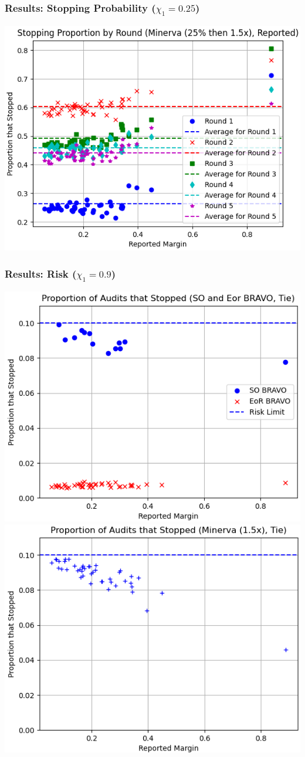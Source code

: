 \documentclass[aspectratio=169]{beamer}
\begin{document}
\begin{frame}
\frametitle{Results: Stopping Probability ($\chi_1=0.25$)}

\includegraphics[width=.75\textwidth]{minerva25percthen1p5_sprob.png}
\end{frame}



\begin{frame}
\frametitle{Results: Risk ($\chi_1=0.9$)}


\hspace{-1cm}
\includegraphics[width=.5\textwidth]{bravo_risks.png}
\pause 
\includegraphics[width=.5\textwidth]{riskminerva1p5_10t4.png}

\end{frame}
\end{document}

